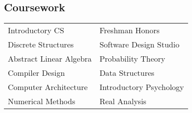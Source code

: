 \documentclass[10pt]{article} %
\begin{document}
\begin{paracol}{2}

\section{Coursework}

\begin{tabular}{l l}
Introductory CS & Freshman Honors\\
Discrete Structures & Software Design Studio\\
Abstract Linear Algebra &  Probability Theory\\
Compiler Design & Data Structures\\
Computer Architecture & Introductory Psychology\\
Numerical Methods & Real Analysis\\
\end{tabular} \\











\end{paracol}
\end{document}
